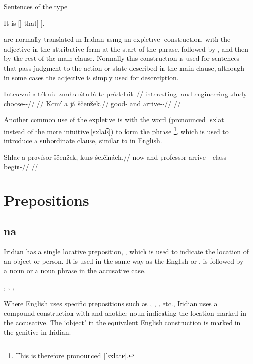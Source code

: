Sentences of the type

\ex
It is [] that[ ].
\xe

are normally translated in Iridian using an expletive- construction, with the adjective in the attributive form at the start of the phrase, followed by , and then by the rest of the main clause. Normally this construction is used for sentences that pass judgment to the action or state described in the main clause, although in some cases the adjective is simply used for descrciption.

\pex
\begingl
    \gla Interezní a téknik znohouštnilá te prádelnik.//
    \glb interesting-\Att{} and engineering study  choose-\Pv{}-\Pf{}//
    \glft {}//
\endgl
\xe
\pex
\begingl
    \gla Komí a já ščenžek.//
    \glb good-\Att{} and \Second{}\Sg{} arrive-\Av{}-\Pf{}//
    \glft {}//
\endgl
\xe

Another common use of the expletive  is with the word  (pronounced [sxlat] instead of the more intuitive [sxlat͡s]) to form the phrase \footnote{This is therefore pronounced [ˈsxlatɐ].}, which is used to introduce a subordinate clause, similar to  in English.

\pex
\begingl
    \gla Shlac a provísor ščenžek, kurs šelčinách.//
    \glb now and professor arrive-\Av{}-\Pf{} class begin-//
    \glft {}//
\endgl
\xe


\section{Prepositions}

\subsection{na}

Iridian has a single locative preposition, , which is used to indicate the location of an object or person. It is used in the same way as the English  or .  is followed by a noun or a noun phrase in the accusative case.

\pex
\a {}, 
\a {}, 
\a {}, 
\xe

Where English uses specific prepositions such as , , , etc., Iridian uses a compound construction with  and another noun indicating the location marked in the accusative. The `object' in the equivalent English construction is marked in the genitive in Iridian.


